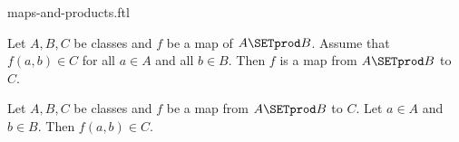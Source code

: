 \documentclass{naproche-library}
\begin{document}
\begin{smodule}[title=Maps and Products]{maps-and-products.ftl}

\begin{proposition}[forthel,id=FOUNDATIONS_06_2754759509409792]
  Let $A, B, C$ be classes and $f$ be a map of $A \SETprod B$.
  Assume that $f(a,b) \in C$ for all $a \in A$ and all $b \in B$.
  Then $f$ is a map from $A \SETprod B$ to $C$.
\end{proposition}

\begin{proposition}[forthel,id=FOUNDATIONS_06_2304295212941312]
  Let $A, B, C$ be classes and $f$ be a map from $A \SETprod B$ to $C$.
  Let $a \in A$ and $b \in B$.
  Then $f(a,b) \in C$.
\end{proposition}
\end{smodule}
\end{document}
